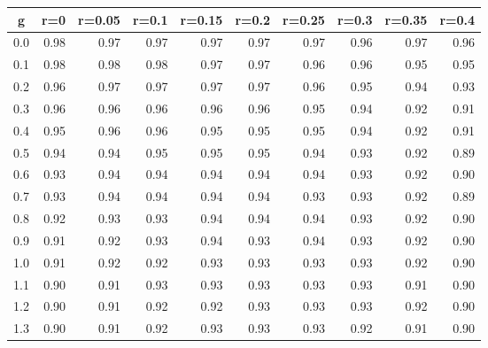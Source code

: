 %
\begin{table}[!tbp]
 \begin{center}
 \begin{tabular}{rrrrrrrrrr}\hline\hline
\multicolumn{1}{c}{g}&\multicolumn{1}{c}{r=0}&\multicolumn{1}{c}{r=0.05}&\multicolumn{1}{c}{r=0.1}&\multicolumn{1}{c}{r=0.15}&\multicolumn{1}{c}{r=0.2}&\multicolumn{1}{c}{r=0.25}&\multicolumn{1}{c}{r=0.3}&\multicolumn{1}{c}{r=0.35}&\multicolumn{1}{c}{r=0.4}\tabularnewline
\hline
0.0&0.98&0.97&0.97&0.97&0.97&0.97&0.96&0.97&0.96\tabularnewline
0.1&0.98&0.98&0.98&0.97&0.97&0.96&0.96&0.95&0.95\tabularnewline
0.2&0.96&0.97&0.97&0.97&0.97&0.96&0.95&0.94&0.93\tabularnewline
0.3&0.96&0.96&0.96&0.96&0.96&0.95&0.94&0.92&0.91\tabularnewline
0.4&0.95&0.96&0.96&0.95&0.95&0.95&0.94&0.92&0.91\tabularnewline
0.5&0.94&0.94&0.95&0.95&0.95&0.94&0.93&0.92&0.89\tabularnewline
0.6&0.93&0.94&0.94&0.94&0.94&0.94&0.93&0.92&0.90\tabularnewline
0.7&0.93&0.94&0.94&0.94&0.94&0.93&0.93&0.92&0.89\tabularnewline
0.8&0.92&0.93&0.93&0.94&0.94&0.94&0.93&0.92&0.90\tabularnewline
0.9&0.91&0.92&0.93&0.94&0.93&0.94&0.93&0.92&0.90\tabularnewline
1.0&0.91&0.92&0.92&0.93&0.93&0.93&0.93&0.92&0.90\tabularnewline
1.1&0.90&0.91&0.93&0.93&0.93&0.93&0.93&0.91&0.90\tabularnewline
1.2&0.90&0.91&0.92&0.92&0.93&0.93&0.93&0.92&0.90\tabularnewline
1.3&0.90&0.91&0.92&0.93&0.93&0.93&0.92&0.91&0.90\tabularnewline
\hline
\end{tabular}

\end{center}

\end{table}

